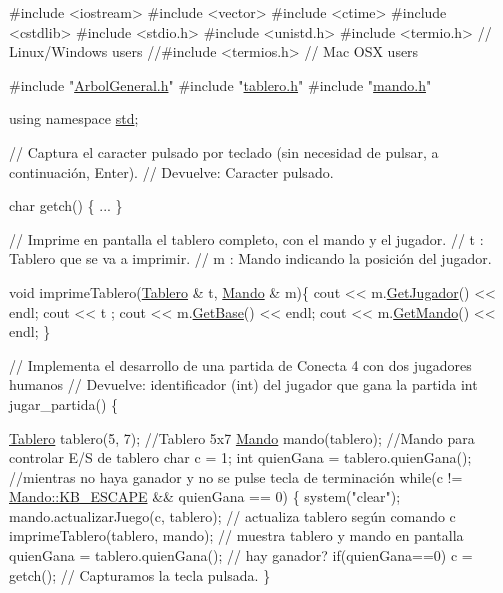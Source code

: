 \begin{DoxyCode}
\textcolor{preprocessor}{#include <iostream>}
\textcolor{preprocessor}{#include <vector>}
\textcolor{preprocessor}{#include <ctime>}
\textcolor{preprocessor}{#include <cstdlib>}
\textcolor{preprocessor}{#include <stdio.h>}
\textcolor{preprocessor}{#include <unistd.h>}
\textcolor{preprocessor}{#include <termio.h>}         \textcolor{comment}{// Linux/Windows users}
\textcolor{comment}{//#include <termios.h>      // Mac OSX users}

\textcolor{preprocessor}{#include "\hyperlink{ArbolGeneral_8h}{ArbolGeneral.h}"}
\textcolor{preprocessor}{#include "\hyperlink{tablero_8h}{tablero.h}"}
\textcolor{preprocessor}{#include "\hyperlink{mando_8h}{mando.h}"}

\textcolor{keyword}{using namespace }\hyperlink{namespacestd}{std};

\textcolor{comment}{// Captura el caracter pulsado por teclado (sin necesidad de pulsar, a continuación, Enter).}
\textcolor{comment}{// Devuelve: Caracter pulsado.}

\textcolor{keywordtype}{char} getch() \{
 ...
\}

\textcolor{comment}{// Imprime en pantalla el tablero completo, con el mando y el jugador.}
\textcolor{comment}{// t : Tablero que se va a imprimir.}
\textcolor{comment}{// m : Mando indicando la posición del jugador.}

\textcolor{keywordtype}{void} imprimeTablero(\hyperlink{classTablero}{Tablero} & t, \hyperlink{classMando}{Mando} & m)\{
    cout << m.\hyperlink{classMando_a6ca29d035353a57aba1bd785d8f81c89}{GetJugador}() << endl;
    cout << t ;
    cout << m.\hyperlink{classMando_a656a8d30e54ac1c476e8fab5a7d9e66f}{GetBase}() << endl;
    cout << m.\hyperlink{classMando_ac7ff39c5a065899658f8ee3a335ee50f}{GetMando}() << endl;
\}


\textcolor{comment}{// Implementa el desarrollo de una partida de Conecta 4 con dos jugadores humanos}
\textcolor{comment}{// Devuelve: identificador (int) del jugador que gana la partida}
\textcolor{keywordtype}{int} jugar\_partida() \{

    \hyperlink{classTablero}{Tablero} tablero(5, 7);      \textcolor{comment}{//Tablero 5x7}
    \hyperlink{classMando}{Mando} mando(tablero);       \textcolor{comment}{//Mando para controlar E/S de tablero}
    \textcolor{keywordtype}{char} c = 1;
    \textcolor{keywordtype}{int} quienGana = tablero.quienGana();
    \textcolor{comment}{//mientras no haya ganador y no se pulse tecla de terminación}
    \textcolor{keywordflow}{while}(c != \hyperlink{classMando_a3c4e7465d5b25fcaf8f3b50b444421a3}{Mando::KB\_ESCAPE} && quienGana == 0) \{
        system(\textcolor{stringliteral}{"clear"});
        mando.actualizarJuego(c, tablero);  \textcolor{comment}{// actualiza tablero según comando c }
        imprimeTablero(tablero, mando);     \textcolor{comment}{// muestra tablero y mando en pantalla}
        quienGana = tablero.quienGana();    \textcolor{comment}{// hay ganador?}
        \textcolor{keywordflow}{if}(quienGana==0) c = getch();       \textcolor{comment}{// Capturamos la tecla pulsada.    }
    \}


\end{DoxyCode}
